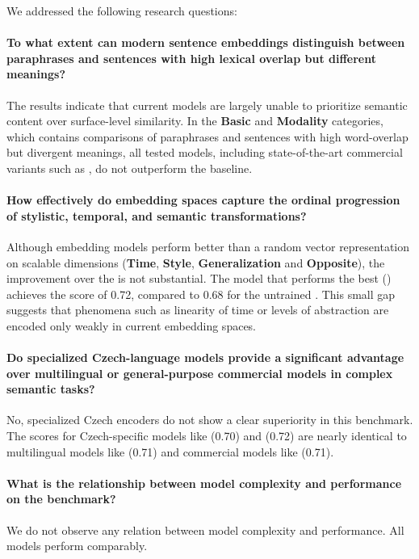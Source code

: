 \begin{mdframed}[
    linecolor=gray,
    linewidth=2pt,
    roundcorner=5,
    backgroundcolor=gray!5
]
\noindent
We addressed the following research questions:

\paragraph{To what extent can modern sentence embeddings distinguish between paraphrases and sentences with high lexical overlap but different meanings?}
The results indicate that current models are largely unable to prioritize semantic content over surface-level similarity. In the \textbf{Basic} and \textbf{Modality} categories, which contains comparisons of paraphrases and sentences with high word-overlap but divergent meanings, all tested models, including state-of-the-art commercial variants such as \tetrilarge, do not outperform the \random baseline. 

\paragraph{How effectively do embedding spaces capture the ordinal progression of stylistic, temporal, and semantic transformations?}
Although embedding models perform better than a random vector representation on scalable dimensions (\textbf{Time}, \textbf{Style}, \textbf{Generalization} and \textbf{Opposite}), the improvement over the \randombert is not substantial. The model that performs the best (\simcse) achieves the \costraminus score of 0.72, compared to 0.68 for the untrained \randombert. This small gap suggests that phenomena such as  linearity of time or levels of abstraction are encoded only weakly  in current embedding spaces.
    
\paragraph{Do specialized Czech-language models provide a significant advantage over multilingual or general-purpose commercial models in complex semantic tasks?}
No, specialized Czech encoders do not show a clear superiority in this benchmark. The \costraminus scores for Czech-specific models like \retromae (0.70) and \simcse (0.72) are nearly identical to multilingual models like \mepet (0.71) and commercial models like \tetrilarge (0.71). 
 
\paragraph{What is the relationship between model complexity and performance on the \costra benchmark?} 
We do not observe any relation between model complexity and performance. All models perform comparably.
\end{mdframed}